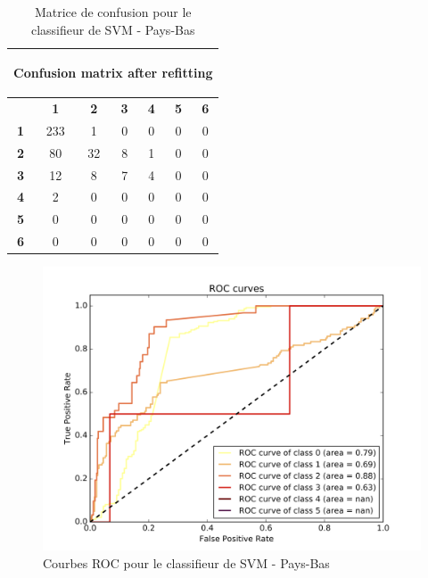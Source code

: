 \documentclass{book}
\begin{document}
\begin{table}[H]
  \begin{center}
  \begin{adjustbox}{max width=\textwidth}
  \begin{tabular}{|c|c|c|c|c|c|c|}
    \hline
    \multicolumn{7}{|c|}{{ \begin{bf}Confusion matrix after refitting\end{bf}}} \\
    \hline
     & \textbf{1} & \textbf{2} & \textbf{3} & \textbf{4} & \textbf{5} & \textbf{6}\\
    \hline
    \textbf{1} & 233 & 1 & 0 & 0 & 0 & 0\\
    \hline
    \textbf{2} & 80 & 32 & 8 & 1 & 0 & 0\\
    \hline
    \textbf{3} & 12 & 8 & 7 & 4 & 0 & 0\\
    \hline
    \textbf{4} & 2 & 0 & 0 & 0 & 0 & 0\\
    \hline
    \textbf{5} & 0 & 0 & 0 & 0 & 0 & 0\\
    \hline
    \textbf{6} & 0 & 0 & 0 & 0 & 0 & 0\\
    \hline
  \end{tabular}
  \end{adjustbox}
  \end{center}
  \caption{Matrice de confusion pour le classifieur de SVM - Pays-Bas}
  \label{svm_cm_pays-bas}
\end{table}

\begin{figure}[H]
 \begin{center}
\includegraphics[scale=0.4]{../../data/Pays-Bas/test/Support_Vector_Gaussian_Classification/Support_Vector_Gaussian_Classification_roc.png}
 \end{center}
 \caption{Courbes ROC pour le classifieur de SVM - Pays-Bas}
 \label{svm_roc_pays-bas}
\end{figure}
\end{document}
